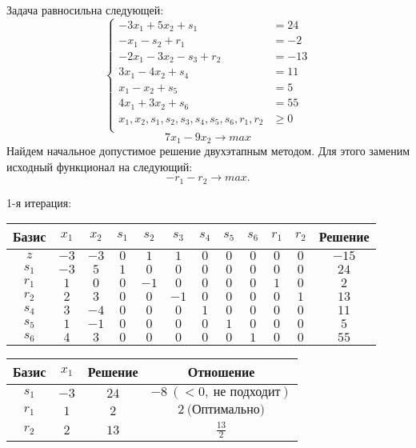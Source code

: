 \documentclass{article}%
\begin{document}
Задача равносильна следующей: %
\[%
\left\{\begin{aligned}-3x_{1}+5x_{2}+s_{1} & =24 \\-x_{1}-s_{2}+r_{1} & =-2 \\-2x_{1}-3x_{2}-s_{3}+r_{2} & =-13 \\3x_{1}-4x_{2}+s_{4} & =11 \\x_{1}-x_{2}+s_{5} & =5 \\4x_{1}+3x_{2}+s_{6} & =55 \\x_{1},x_{2},s_{1},s_{2},s_{3},s_{4},s_{5},s_{6},r_{1},r_{2} & \ge 0 \\ \end{aligned}\right.%
\]%
\[%
7x_{1}-9x_{2}  \to max%
\]%
Найдем начальное допустимое решение двухэтапным методом. Для этого заменим исходный функционал на следующий: %
\[%
-r_{1}-r_{2}\to max.%
\]%
\begin{flushleft}%
1{-}я итерация: %
\newline%
\newline%
\renewcommand{\arraystretch}{1.3}%
\begin{tabular}{|c|cccccccccc|c|}%
\hline%
Базис&$x_{1}$&$x_{2}$&$s_{1}$&$s_{2}$&$s_{3}$&$s_{4}$&$s_{5}$&$s_{6}$&$r_{1}$&$r_{2}$&Решение\\%
\hline%
$z$&$-3$&$-3$&$0$&$1$&$1$&$0$&$0$&$0$&$0$&$0$&$-15$\\%
\hline%
$s_{1}$&$-3$&$5$&$1$&$0$&$0$&$0$&$0$&$0$&$0$&$0$&$24$\\%
$r_{1}$&$1$&$0$&$0$&$-1$&$0$&$0$&$0$&$0$&$1$&$0$&$2$\\%
$r_{2}$&$2$&$3$&$0$&$0$&$-1$&$0$&$0$&$0$&$0$&$1$&$13$\\%
$s_{4}$&$3$&$-4$&$0$&$0$&$0$&$1$&$0$&$0$&$0$&$0$&$11$\\%
$s_{5}$&$1$&$-1$&$0$&$0$&$0$&$0$&$1$&$0$&$0$&$0$&$5$\\%
$s_{6}$&$4$&$3$&$0$&$0$&$0$&$0$&$0$&$1$&$0$&$0$&$55$\\%
\hline%
\end{tabular}%
\newline%
\newline%
\newline%
\begin{tabular}{|cccc|}%
\hline%
Базис&$x_{1}$&Решение&Отношение\\%
\hline%
$s_{1}$&$-3$&$24$&$-8\: (< 0, \: \text{не подходит})$\\%
$r_{1}$&$1$&$2$&$2\: \text{(Оптимально)}$\\%
$r_{2}$&$2$&$13$&$\frac{13}{2}$\\%

\end{tabular}
\end{flushleft}
\end{document}
